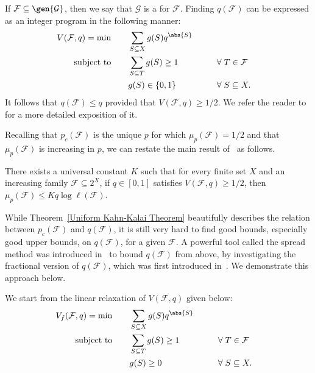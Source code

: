 \documentclass[12pt]{article}
\begin{document}
If $\mathcal{F}\subseteq\gen{\mathcal{G}}$, then we say that $\mathcal{G}$ is a  for $\mathcal{F}$. Finding $q(\mathcal{F})$ can be expressed as an integer program in the following manner: 
\begin{alignat*}{7}
    V(\mathcal{F},q) 
    = \min& &&\displaystyle\sum\limits_{S\subseteq X} g(S) q^{\abs{S}}
    \\
    \text{subject to}&\quad &&\sum\limits_{S\subseteq T} g(S)\geq 1 &&\hspace{3mm}&&\forall\hspace{1mm}  T\in\mathcal{F}
    \\
    &&& g(S)\in\{0,1\} &&\hspace{3mm}&&\forall\hspace{1mm} S\subseteq X.
\end{alignat*}
It follows that $q(\mathcal{F})\leq q$ provided that $V(\mathcal{F}, q)\geq 1/2$. 
We refer the reader to~\cite{perkins2024searchingsharpthresholdsrandom} for a more detailed exposition of it.

Recalling that $p_c(\mathcal{F})$ is the unique $p$ for which $\mu_p(\mathcal{F}) = 1/2$ and that $\mu_p(\mathcal{F})$ is increasing in $p$, we can restate the main result of~\cite{park2023proofkahnkalaiconjecture} as follows.
 
\begin{theorem}
\label{Uniform Kahn-Kalai Theorem}
There exists a universal constant $K$ such that for every finite set $X$ and an increasing family $\mathcal{F}\subseteq 2^X$, if $q\in [0,1]$ satisfies $V(\mathcal{F},q)\geq 1/2$, then $\mu_p(\mathcal{F})\leq Kq\log\ell(\mathcal{F})$. 
\end{theorem}


While Theorem~\ref{Uniform Kahn-Kalai Theorem} beautifully describes the relation between $p_c({\mathcal F})$ and $q({\mathcal F})$, it is still very hard to find good bounds, especially good upper bounds, on $q({\mathcal F})$, for a given ${\mathcal F}$. A powerful tool called the spread method was introduced in~\cite{frankston2019thresholds} to bound $q({\mathcal F})$ from above, by investigating the fractional version of  $q({\mathcal F})$, which was first introduced in~\cite{TalagrandLPDuality}. We demonstrate this approach below.

We start from the linear relaxation of $V({\mathcal F},q)$ given below:
\begin{alignat*}{7}
    V_f(\mathcal{F},q) 
    = \min& &&\displaystyle\sum\limits_{S\subseteq X} g(S) q^{\abs{S}}
    \\
    \text{subject to}&\quad &&\sum\limits_{S\subseteq T} g(S)\geq 1 &&\hspace{3mm}&&\forall\hspace{1mm}  T\in\mathcal{F}
    \\
    &&& g(S)\geq 0 &&\hspace{3mm}&&\forall\hspace{1mm} S\subseteq X.
\end{alignat*}
\end{document}
